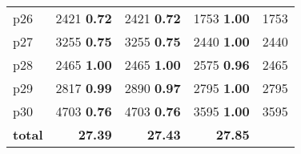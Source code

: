 \begin{tabular}{lrrrr}
\multicolumn{1}{l|}{p26} & {\footnotesize 2421} \textbf{0.72} & {\footnotesize 2421} \textbf{0.72} & {\footnotesize 1753} \textbf{1.00} & \multicolumn{1}{|r}{1753}\\
\multicolumn{1}{l|}{p27} & {\footnotesize 3255} \textbf{0.75} & {\footnotesize 3255} \textbf{0.75} & {\footnotesize 2440} \textbf{1.00} & \multicolumn{1}{|r}{2440}\\
\multicolumn{1}{l|}{p28} & {\footnotesize 2465} \textbf{1.00} & {\footnotesize 2465} \textbf{1.00} & {\footnotesize 2575} \textbf{0.96} & \multicolumn{1}{|r}{2465}\\
\multicolumn{1}{l|}{p29} & {\footnotesize 2817} \textbf{0.99} & {\footnotesize 2890} \textbf{0.97} & {\footnotesize 2795} \textbf{1.00} & \multicolumn{1}{|r}{2795}\\
\multicolumn{1}{l|}{p30} & {\footnotesize 4703} \textbf{0.76} & {\footnotesize 4703} \textbf{0.76} & {\footnotesize 3595} \textbf{1.00} & \multicolumn{1}{|r}{3595}\\
\midrule
\textbf{total} & \textbf{27.39} & \textbf{27.43} & \textbf{27.85} & \\
\bottomrule
\end{tabular}

